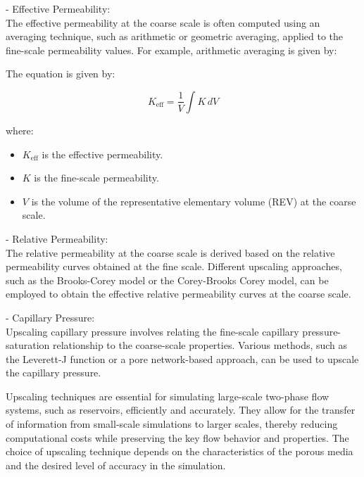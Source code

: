 \documentclass[letterpaper,12pt]{article}
\begin{document}
	- Effective Permeability:\\ The effective permeability at the coarse scale is often computed using an averaging technique, such as arithmetic or geometric averaging, applied to the fine-scale permeability values. For example, arithmetic averaging is given by:
	\smallskip
	
     The equation is given by:
     
     \[ K_{\text{eff}} = \frac{1}{V} \int K \, dV \]
     
     where:
     \begin{itemize}
     	\item   \( K_{\text{eff}} \) is the effective permeability.
     	 \item \( K \) is the fine-scale permeability.
     	\item  \( V \) is the volume of the representative elementary volume (REV) at the coarse scale.
     \end{itemize}
    
	
	- Relative Permeability: \\
		 The relative permeability at the coarse scale is derived based on the relative permeability curves obtained at the fine scale. Different upscaling approaches, such as the Brooks-Corey model or the Corey-Brooks Corey model, can be employed to obtain the effective relative permeability curves at the coarse scale.
	
	- Capillary Pressure:\\
		 Upscaling capillary pressure involves relating the fine-scale capillary pressure-saturation relationship to the coarse-scale properties. Various methods, such as the Leverett-J function or a pore network-based approach, can be used to upscale the capillary pressure.
		 \smallskip
	
	Upscaling techniques are essential for simulating large-scale two-phase flow systems, such as reservoirs, efficiently and accurately. They allow for the transfer of information from small-scale simulations to larger scales, thereby reducing computational costs while preserving the key flow behavior and properties. The choice of upscaling technique depends on the characteristics of the porous media and the desired level of accuracy in the simulation.

	
	

	
	
	
\end{document}

